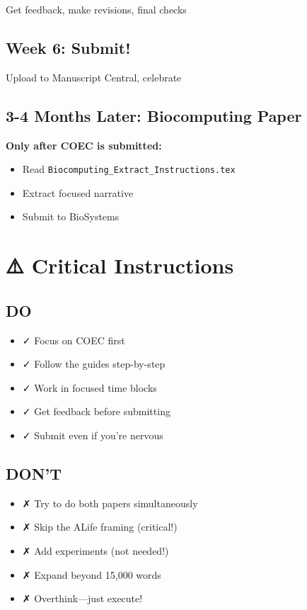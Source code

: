 \documentclass[11pt]{article}
\begin{document}
Get feedback, make revisions, final checks

\subsection*{Week 6: Submit!}

Upload to Manuscript Central, celebrate 🎉

\subsection*{3-4 Months Later: Biocomputing Paper}

\textbf{Only after COEC is submitted:}
\begin{itemize}
    \item Read \texttt{Biocomputing\_Extract\_Instructions.tex}
    \item Extract focused narrative
    \item Submit to BioSystems
\end{itemize}

\section*{⚠️ Critical Instructions}

\subsection*{DO}
\begin{itemize}
    \item \textcolor{normal}{✓ Focus on COEC first}
    \item \textcolor{normal}{✓ Follow the guides step-by-step}
    \item \textcolor{normal}{✓ Work in focused time blocks}
    \item \textcolor{normal}{✓ Get feedback before submitting}
    \item \textcolor{normal}{✓ Submit even if you're nervous}
\end{itemize}

\subsection*{DON'T}
\begin{itemize}
    \item \textcolor{urgent}{✗ Try to do both papers simultaneously}
    \item \textcolor{urgent}{✗ Skip the ALife framing (critical!)}
    \item \textcolor{urgent}{✗ Add experiments (not needed!)}
    \item \textcolor{urgent}{✗ Expand beyond 15,000 words}
    \item \textcolor{urgent}{✗ Overthink—just execute!}
\end{itemize}
\end{document}
